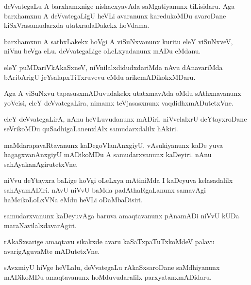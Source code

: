 \documentclass{article}
\begin{document}
\begin{mn}
deVvategaLu A barxhamxnige nishacxyavAda saMgatiyanunx tiLisidaru. Aga
barxhamxnu A deVvategaLigU heVLi avaranunx karedukoMDu avaroDane
kiSxVrasamudarxda utatxradaDakekx hoVdama.
\end{mn}

\begin{mn}
barxhamxnu A sathxLakekx hoVgi A viSuNxvanunx kuritu eleY viSuNxveV,
niVnu beVga eLu. deVvategaLige oLeLxyadanunx mADu eMdanu.
\end{mn}

\begin{mn}
eleY puMDariVkAkaSxneV, niVnilalxdidudxdariMda nAvu dAnavariMda
bAribArigU jeYsalapxTiTxruvevu eMdu arikemADikokxMDaru.
\end{mn}

\begin{mn}
Aga A viSuNxvu tapasusxmADuvudakekx utatxmavAda oMdu sAthxnavanunx
yoVcisi, eleY deVvategaLira, nimamx teVjasasxnunx vaqdidhxmADutetxVne.
\end{mn}

\begin{mn}%
eleY deVvategaLirA, nAnu heVLuvudanunx mADiri. niVvelalxrU
deYtayxroDane seVrikoMDu quSadhigaLanenxlAlx samudarxdalilx hAkiri.
\end{mn}

\begin{mn}
maMdarapavaRtavanunx kaDegoVlanAnxgiyU, vAsukiyanunx kaDe yuva
hagagxvanAnxgiyU mADikoMDu A samudarxvanunx kaDeyiri. nAnu sahAyakanAgirutetxVne.
\end{mn}

\begin{mn}
niVvu deYtayxra baLige hoVgi oLeLxya mAtiniMda I kaDeyuva kelasadalilx
sahAyamADiri. nAvU niVvU baMda padAthaRgaLanunx samavAgi
haMcikoLoLxVNa eMdu heVLi oDaMbaDisiri.
\end{mn}

\begin{mn}
samudarxvanunx kaDeyuvAga baruva amaqtavanunx pAnamADi niVvU kUDa maraNavilalxdavarAgiri.
\end{mn}

\begin{mn}
rAkaSxsarige amaqtavu sikakxde avaru kaSaTxpaTuTxkoMdeV palavu
avarigAguvaMte mADutetxVne.
\end{mn}

\begin{mn}%
sAvxmiyU hiVge heVLalu, deVvategaLu rAkaSxsaroDane saMdhiyanunx
mADikoMDu amaqtavanunx hoMduvudaralilx parxyatanxmADidaru.
\end{mn}
\end{document}
